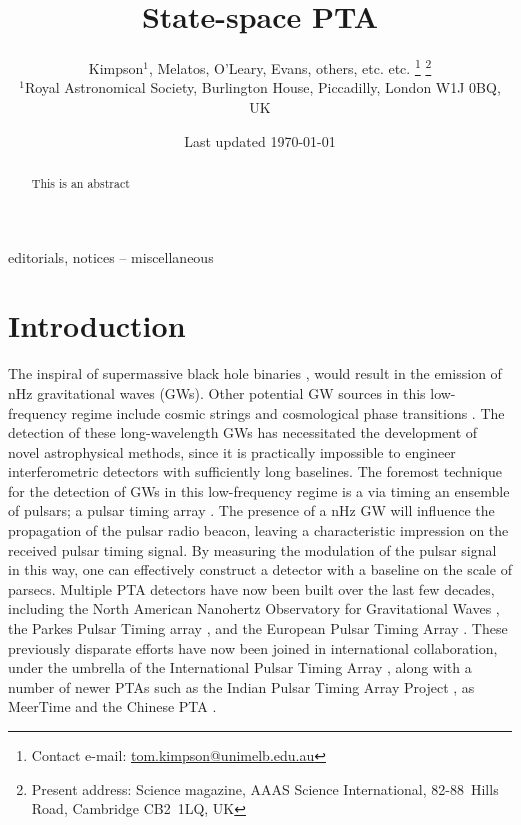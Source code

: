 \documentclass[fleqn,usenatbib,useAMS]{mnras}
\title[Kalman PTA]{State-space PTA}
\author[Kimpson]{Kimpson$^{1}$, Melatos, O'Leary, Evans, others, etc. etc. %
\thanks{Contact e-mail: \href{tom.kimpson@unimelb.edu.au}{tom.kimpson@unimelb.edu.au}}%
\thanks{Present address: Science magazine, AAAS Science International, \mbox{82-88}~Hills Road, Cambridge CB2~1LQ, UK}%
\\
$^{1}$Royal Astronomical Society, Burlington House, Piccadilly, London W1J 0BQ, UK}
\date{Last updated \today}
\begin{document}
\label{firstpage}
\pagerange{\pageref{firstpage}--\pageref{lastpage}}
\maketitle

\begin{abstract}
This is an abstract
\end{abstract}

\begin{keywords}
editorials, notices -- miscellaneous
\end{keywords}



\begingroup
\let\clearpage\relax
\endgroup
\newpage
\section{Introduction}
The inspiral of supermassive black hole binaries \citep[SMBHBs;][]{Rajagopal1995,Wyithe2003,Sesana2013,Ravi2015MNRAS.447.2772R},  would result in the emission of nHz gravitational waves (GWs). Other potential GW sources in this low-frequency regime include cosmic strings \citep[e.g.][]{PTAstring} and cosmological phase transitions \citep[e.g.][]{PTAphase}. The detection of these long-wavelength GWs has necessitated the development of novel astrophysical methods, since it is practically impossible to engineer interferometric detectors with sufficiently long baselines. The foremost technique for the detection of GWs in this  low-frequency regime is a via timing an ensemble of pulsars; a pulsar timing array \citep[PTA;][]{2021hgwa.bookE...4V}. The presence  of a nHz GW will influence the propagation of the pulsar radio beacon, leaving a characteristic impression on the received pulsar timing signal. By measuring the modulation of the pulsar signal in this way, one can effectively construct a detector with a baseline on the scale of parsecs. Multiple PTA detectors have now been built over the last few decades, including the North American Nanohertz Observatory for Gravitational Waves \citep[NANOGrav,][]{2020ApJ...905L..34A}, the Parkes Pulsar Timing array \citep[PPTA][]{2020PASA...37...20K}, and the European Pulsar Timing Array \citep[EPTA,][]{2010CQGra..27h4014F}. These previously disparate efforts have now been joined in international collaboration, under the umbrella of the International Pulsar Timing Array \citep[IPTA,][]{2019MNRAS.490.4666P}, along with a number of newer PTAs such as the Indian Pulsar Timing Array Project \citep[InPTA,][]{ipta}, as MeerTime \citep{meertime2,Meertime} and the Chinese PTA \citep{Hobbs_2019}. \newline 
\end{document}
